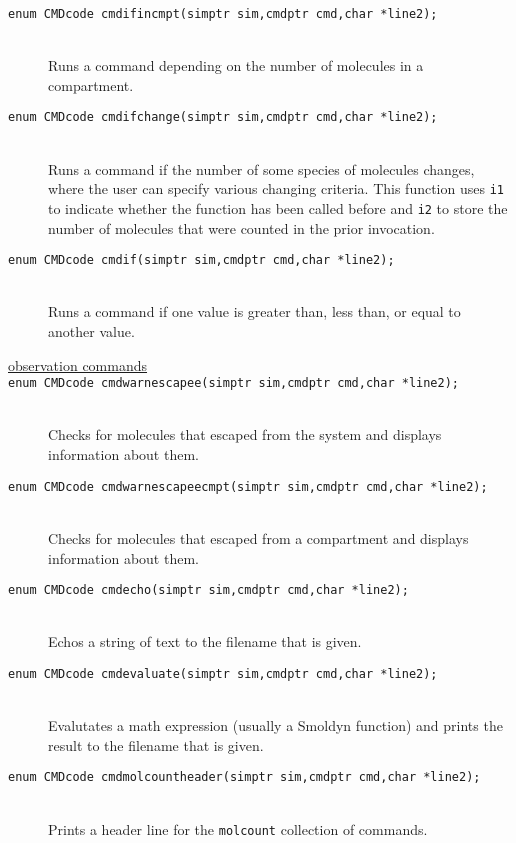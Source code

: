 \documentclass {scrbook}
\newcommand {\ttt} {\texttt}
\begin{document}
\begin{description}
\item[\ttt{enum CMDcode cmdifincmpt(simptr sim,cmdptr cmd,char *line2);}]
\hfill \\
Runs a command depending on the number of molecules in a compartment.

\item[\ttt{enum CMDcode cmdifchange(simptr sim,cmdptr cmd,char *line2);}]
\hfill \\
Runs a command if the number of some species of molecules changes, where the user can specify various changing criteria. This function uses \ttt{i1} to indicate whether the function has been called before and \ttt{i2} to store the number of molecules that were counted in the prior invocation.

\item[\ttt{enum CMDcode cmdif(simptr sim,cmdptr cmd,char *line2);}]
\hfill \\
Runs a command if one value is greater than, less than, or equal to another value.

\item[\underline{observation commands}]

\item[\ttt{enum CMDcode cmdwarnescapee(simptr sim,cmdptr cmd,char *line2);}]
\hfill \\
Checks for molecules that escaped from the system and displays information about them.

\item[\ttt{enum CMDcode cmdwarnescapeecmpt(simptr sim,cmdptr cmd,char *line2);}]
\hfill \\
Checks for molecules that escaped from a compartment and displays information about them.

\item[\ttt{enum CMDcode cmdecho(simptr sim,cmdptr cmd,char *line2);}]
\hfill \\
Echos a string of text to the filename that is given.

\item[\ttt{enum CMDcode cmdevaluate(simptr sim,cmdptr cmd,char *line2);}]
\hfill \\
Evalutates a math expression (usually a Smoldyn function) and prints the result to the filename that is given.

\item[\ttt{enum CMDcode cmdmolcountheader(simptr sim,cmdptr cmd,char *line2);}]
\hfill \\
Prints a header line for the \ttt{molcount} collection of commands.


\end{description}
\end{document}
